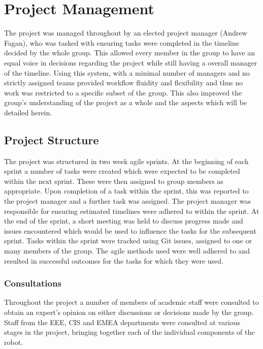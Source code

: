 \chapter{Project Management}\label{pm}

The project was managed throughout by an elected project manager 
(Andrew Fagan), who was tasked with ensuring tasks were 
completed in the timeline decided by the whole group. This 
allowed every member in the group to have an equal voice in 
decisions regarding the project while still having a overall 
manager of the timeline. Using this system, with a minimal 
number of managers and no strictly assigned teams provided
workflow fluidity and flexibility and thus no work was restricted 
to a specific subset of the group. This also improved the 
group's understanding of the project as a whole and the aspects 
which will be detailed herein. 

\section{Project Structure}\label{pm/structure}

The project was structured in two week agile sprints. At the 
beginning of each sprint a number of tasks were created which 
were expected to be completed within the next sprint. These were 
then assigned to group members as appropriate. Upon completion 
of a task within the sprint, this was reported to the project 
manager and a further task was assigned. The project manager was 
responsible for ensuring estimated timelines were adhered to 
within the sprint. At the end of the sprint, a short meeting was 
held to discuss progress made and issues encountered which would 
be used to influence the tasks for the subsequent sprint. Tasks 
within the sprint were tracked using Git issues, assigned to one 
or many members of the group. The agile methods used were well 
adhered to and resulted in successful outcomes for the tasks for which 
they were used. 
	

\subsection{Consultations}\label{pm/consultations}
Throughout the project a number of members of academic staff 
were consulted to obtain an expert's opinion on either 
discussions or decisions made by the group. 
Staff from the EEE, CIS and EMEA departments were 
consulted at various stages in the project, bringing together 
each of the individual components of the robot. 

